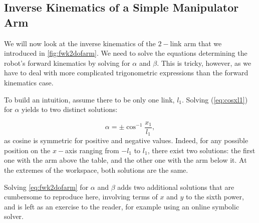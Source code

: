 \subsection{Inverse Kinematics of a Simple Manipulator Arm}\label{sec:kinematics:inverse:arm}

We will now look at the inverse kinematics of the $2-$link arm that we introduced in \cref{fig:fwk2dofarm}. We need to solve the equations determining the robot's forward kinematics by solving for $\alpha$ and $ \beta$.
This is tricky, however, as we have to deal with more complicated trigonometric expressions than the forward kinematics case.

To build an intuition, assume there to be only one link, $l_1$.  Solving (\ref{eq:cosxl1}) for $\alpha$ yields to two distinct solutions:

\begin{equation}
\alpha = \pm \cos^{-1}\frac{x_1}{l_1},
\end{equation}
as cosine is symmetric for positive and negative values.
Indeed, for any possible position on the $x-$axis ranging from $-l_1$ to $l_1$, there exist two solutions: the first one with the arm above the table, and the other one with the arm below it.
At the extremes of the workspace, both solutions are the same.


Solving \ref{eq:fwk2dofarm} for $\alpha$ and $\beta$ adds two additional solutions that are cumbersome to reproduce here, involving terms of $x$ and $y$ to the sixth power, and is left as an exercise to the reader, for example using an online symbolic solver.


